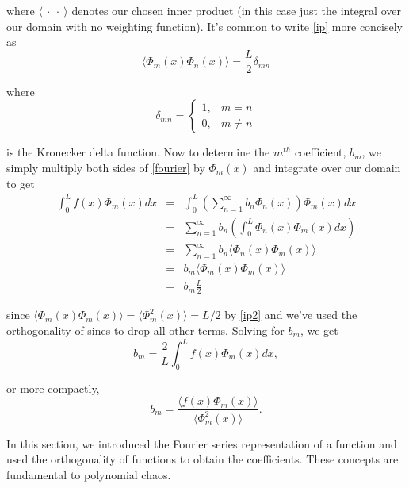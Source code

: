 \documentclass[11pt]{article}
\numberwithin{equation}{section}
\begin{document}
where $\langle \ \cdot \ \cdot \ \rangle$ denotes our chosen inner product (in this case just the integral over our domain with no weighting function). It's common to write \eqref{ip} more concisely as
\begin{equation}
\langle \Phi_m(x) \Phi_n(x) \rangle = \frac{L}{2} \delta_{mn} \label{ip2}
\end{equation}

where
\begin{equation*}
\delta_{mn} =
  \begin{cases}
    1, & m = n \\
    0, & m \neq n
  \end{cases}
\end{equation*}

is the Kronecker delta function. Now to determine the $m^{th}$ coefficient, $b_m$, we simply multiply both sides of \eqref{fourier} by $\Phi_m(x)$ and integrate over our domain to get
\begin{eqnarray*}
\int_0^L f(x) \Phi_m(x) dx & = & \int_0^L \left( \sum_{n = 1}^{\infty} b_n \Phi_n(x) \right) \Phi_m(x) dx \\
& = & \sum_{n = 1}^{\infty}  b_n  \left( \int_0^L \Phi_n(x) \Phi_m(x) dx \right) \\
& = & \sum_{n = 1}^{\infty}  b_n  \langle \Phi_n(x) \Phi_m(x) \rangle \\
& = & b_m  \langle \Phi_m(x) \Phi_m(x) \rangle \\
& = & b_m  \frac{L}{2}
\end{eqnarray*}

since $\langle \Phi_m(x) \Phi_m(x) \rangle = \langle \Phi_m^2(x) \rangle = L/2$ by \eqref{ip2} and we've used the orthogonality of sines to drop all other terms. Solving for $b_m$, we get
\begin{equation}
b_m = \frac{2}{L} \int_0^L f(x) \Phi_m(x) dx,
\end{equation}

or more compactly, 
\begin{equation}
b_m = \frac{\langle f(x) \Phi_m(x) \rangle }{\langle \Phi_m^2(x) \rangle}. \label{fourier_coef}
\end{equation}

In this section, we introduced the Fourier series representation of a function and used the orthogonality of functions to obtain the coefficients. These concepts are fundamental to polynomial chaos.
\end{document}
